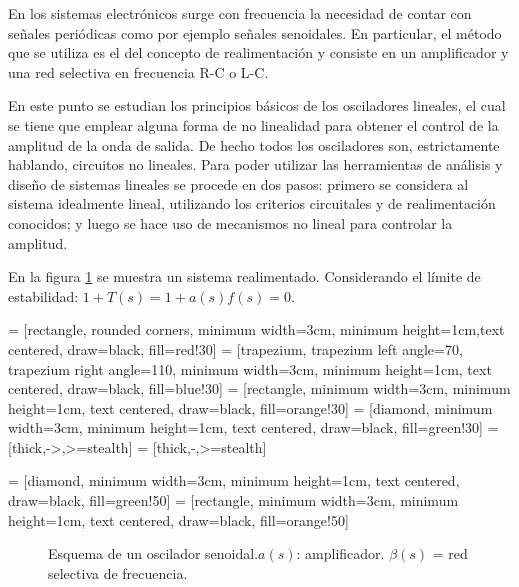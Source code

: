 En los sistemas electrónicos surge con frecuencia la necesidad de contar con señales periódicas como por ejemplo señales senoidales. En particular, el método que se utiliza es el del concepto de realimentación y consiste en un amplificador y una red selectiva en frecuencia R-C o L-C. 

En este punto se estudian los principios básicos de los osciladores lineales, el cual se tiene que emplear alguna forma de no linealidad para obtener el control de la amplitud de la onda de salida. De hecho todos los osciladores son, estrictamente hablando, circuitos no lineales.
Para poder utilizar las herramientas de análisis y diseño de sistemas lineales se procede en dos pasos: primero se considera al sistema idealmente lineal, utilizando los criterios circuitales y de realimentación conocidos; y luego se hace uso de mecanismos no lineal para controlar la amplitud. 

En la figura \ref{1.0} se muestra un sistema realimentado. Considerando el límite de estabilidad: $1 + T(s) = 1 + a(s)f(s) = 0$.

 = [rectangle, rounded corners, minimum width=3cm, minimum height=1cm,text centered, draw=black, fill=red!30]
 = [trapezium, trapezium left angle=70, trapezium right angle=110, minimum width=3cm, minimum height=1cm, text centered, draw=black, fill=blue!30]
 = [rectangle, minimum width=3cm, minimum height=1cm, text centered, draw=black, fill=orange!30]
 = [diamond, minimum width=3cm, minimum height=1cm, text centered, draw=black, fill=green!30]
 = [thick,->,>=stealth]
 = [thick,-,>=stealth]


 = [diamond, minimum width=3cm, minimum height=1cm, text centered, draw=black, fill=green!50] 
 = [rectangle, minimum width=3cm, minimum height=1cm, text centered, draw=black, fill=orange!50]
\begin{figure}[H]
    \centering
\caption{Esquema de un oscilador senoidal.$a(s)$: amplificador. $\beta (s)$ = red selectiva de frecuencia.}
\label{1.0}
\end{figure}




